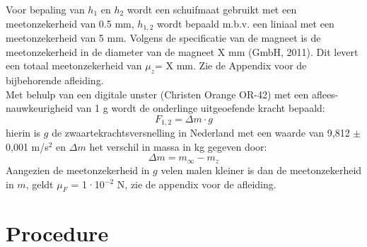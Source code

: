 Voor bepaling van $h_1$ en $h_2$ wordt een schuifmaat gebruikt met een meetonzekerheid van 0.5 mm, $h_{1,2}$ wordt bepaald m.b.v. een liniaal met een meetonzekerheid van 5 mm. Volgens de specificatie van de magneet is de meetonzekerheid in de diameter van de magneet X mm (GmbH, 2011). Dit levert een totaal meetonzekerheid van $\mu_z$= X mm. Zie de Appendix voor de bijbehorende afleiding.\\
Met behulp van een digitale unster (Christen Orange OR-42) met een aflees-nauwkeurigheid van 1 g wordt de onderlinge uitgeoefende kracht bepaald:
\begin{equation}
    F_{1,2}=\Delta m \cdot g
\end{equation}
hierin is $g$ de zwaartekrachtsversnelling in Nederland met een waarde van 9,812 $\pm$ 0,001 m/s$^{2}$ en $\Delta m$ het verschil in massa in kg gegeven door:
\begin{equation}
    \Delta m=m_\infty-m_z			
\end{equation}
Aangezien de meetonzekerheid in $g$ velen malen kleiner is dan de meetonzekerheid in $m$, geldt $\mu_F$ = 1·10$^{-2}$ N, zie de appendix voor de afleiding.

\section{Procedure}